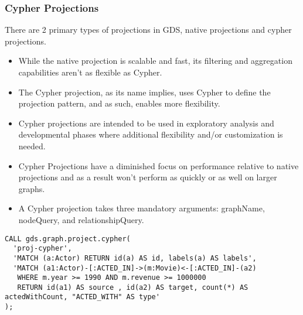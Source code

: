 \begin{frame}[fragile]\frametitle{Cypher Projections}

There are 2 primary types of projections in GDS, native projections and cypher projections.

\begin{itemize}
\item While the native projection is scalable and fast, its filtering and aggregation capabilities aren’t as flexible as Cypher. \item The Cypher projection, as its name implies, uses Cypher to define the projection pattern, and as such, enables more flexibility.
\item Cypher projections are intended to be used in exploratory analysis and developmental phases where additional flexibility and/or customization is needed.
\item Cypher Projections have a diminished focus on performance relative to native projections and as a result won’t perform as quickly or as well on larger graphs.
\item A Cypher projection takes three mandatory arguments: graphName, nodeQuery, and relationshipQuery. 
\end{itemize}

\begin{lstlisting}
CALL gds.graph.project.cypher(
  'proj-cypher',
  'MATCH (a:Actor) RETURN id(a) AS id, labels(a) AS labels',
  'MATCH (a1:Actor)-[:ACTED_IN]->(m:Movie)<-[:ACTED_IN]-(a2)
   WHERE m.year >= 1990 AND m.revenue >= 1000000
   RETURN id(a1) AS source , id(a2) AS target, count(*) AS actedWithCount, "ACTED_WITH" AS type'
);
\end{lstlisting}

\end{frame}

